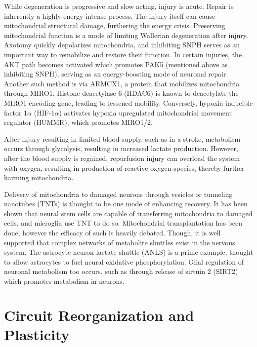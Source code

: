 \documentclass[12pt]{report}
\begin{document}
While degeneration is progressive and slow acting, injury is acute. Repair is inherently a highly energy intense process. The injury itself can cause mitochondrial structural damage, furthering the energy crisis. Preserving mitochondrial function is a mode of limiting Wallerian degeneration after injury. Axotomy quickly depolarizes mitochondria, and inhibiting SNPH serves as an important way to remobilize and restore their function. In certain injuries, the AKT path becomes activated which promotes PAK5 (mentioned above as inhibiting SNPH), serving as an energy-boosting mode of neuronal repair. Another such method is via ARMCX1, a protein that mobilizes mitochondria through MIRO1. Histone deacetylase 6 (HDAC6) is known to deacetylate the MIRO1 encoding gene, leading to lessened mobility. Conversely, hypoxia inducible factor 1$\alpha$ (HIF-1$\alpha$) activates hypoxia upregulated mitochondrial movement regulator (HUMMR), which promotes MIRO1/2. \newline

After injury resulting in limited blood supply, such as in a stroke, metabolism occurs through glycolysis, resulting in increased lactate production. However, after the blood supply is regained, repurfusion injury can overload the system with oxygen, resulting in production of reactive oxygen species, thereby further harming mitochondria.\newline

Delivery of mitochondria to damaged neurons through vesicles or tunneling nanotubes (TNTs) is thought to be one mode of enhancing recovery. It has been shown that neural stem cells are capable of transferring mitochondria to damaged cells, and microglia use TNT to do so. Mitochondrial transplantation has been done, however the efficacy of such is heavily debated. Though, it is well supported that complex networks of metabolite shuttles exist in the nervous system. The astrocyte-neuron lactate shuttle (ANLS) is a prime example, thought to allow astrocytes to fuel neural oxidative phosphorylation. Glial regulation of neuronal metabolism too occurs, such as through release of sirtuin 2 (SIRT2) which promotes metabolism in neurons. 





\chapter{Circuit Reorganization and Plasticity}

\label{sec:CircuitReorganization}
\end{document}
